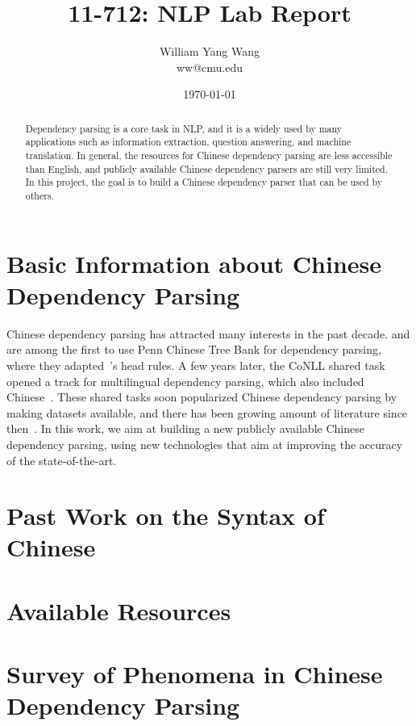 \documentclass[11pt,letterpaper]{article}
\title{11-712:  NLP Lab Report}
\author{William Yang Wang\\
ww@cmu.edu}
\date{\today}
\newcommand{\nascomment}[1]{\textcolor{blue}{\textbf{[#1 --NAS]}}}
\begin{document}
\maketitle
\begin{abstract}
Dependency parsing is a core task in NLP, and it is a widely used by many applications such as information extraction,
question answering, and machine translation. In general, the resources for Chinese dependency parsing are less accessible than English, and publicly available Chinese dependency parsers are still very limited. In this project, the goal is to build a Chinese dependency parser that can be used by others.
\end{abstract}

\section{Basic Information about Chinese Dependency Parsing}
Chinese dependency parsing has attracted many interests in the past decade.
\cite{bikel2000two} and \citet{Chiang:2002} are among the first to use Penn Chinese Tree Bank for dependency parsing,
where they adapted~\cite{xia1999extracting}'s head rules.
A few years later, the CoNLL shared task opened a track for multilingual dependency parsing,
which also included Chinese~\citep{buchholz2006conll,nilsson2007conll}.
These shared tasks soon popularized Chinese dependency parsing by making datasets available,
and there has been growing amount of literature since then~\citep{zhang2008tale,nivre2007maltparser,sagae2007dependency,
che2010ltp,carreras2007experiments,duan2007probabilistic}.
In this work, we aim at building a new publicly available Chinese dependency parsing, using 
new technologies that aim at improving the accuracy of the state-of-the-art.

\section{Past Work on the Syntax of Chinese}

\section{Available Resources}


\section{Survey of Phenomena in Chinese Dependency Parsing}
\end{document}
